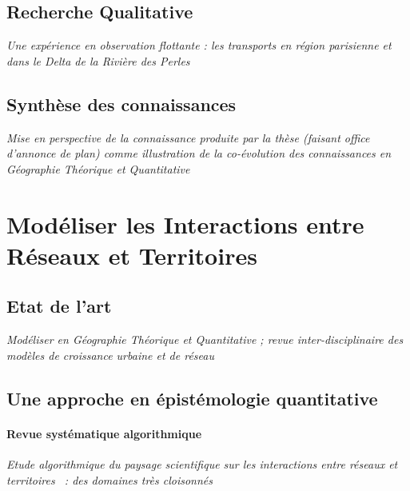 \subsection{Recherche Qualitative}

\textit{Une expérience en observation flottante : les transports en région parisienne et dans le Delta de la Rivière des Perles} 



\subsection{Synthèse des connaissances}

\textit{Mise en perspective de la connaissance produite par la thèse (faisant office d'annonce de plan) comme illustration de la co-évolution des connaissances en Géographie Théorique et Quantitative~\cite{raimbault2017theo}}




\section{Modéliser les Interactions entre Réseaux et Territoires}


\subsection{Etat de l'art}

\textit{Modéliser en Géographie Théorique et Quantitative ; revue inter-disciplinaire des modèles de croissance urbaine et de réseau}




\subsection{Une approche en épistémologie quantitative}



\paragraph{Revue systématique algorithmique}

\textit{Etude algorithmique du paysage scientifique sur les interactions entre réseaux et territoires~\cite{raimbault2015models} : des domaines très cloisonnés}


